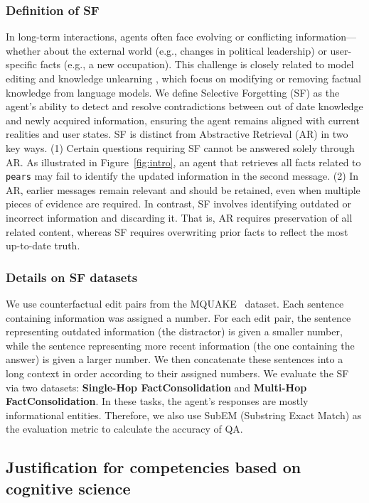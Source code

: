 \subsubsection{Definition of SF} In long-term interactions, agents often face evolving or conflicting information—whether about the external world (e.g., changes in political leadership) or user-specific facts (e.g., a new occupation). This challenge is closely related to model editing \citep{memit, alphaedit} and knowledge unlearning \citep{Large_Scale_Knowledge_Washing}, which focus on modifying or removing factual knowledge from language models.
We define Selective Forgetting (SF) as the agent’s ability to detect and resolve contradictions between out of date knowledge and newly acquired information, ensuring the agent remains aligned with current realities and user states.
SF is distinct from Abstractive Retrieval (AR) in two key ways. (1) Certain questions requiring SF cannot be answered solely through AR. As illustrated in Figure~\ref{fig:intro}, an agent that retrieves all facts related to \texttt{pears} may fail to identify the updated information in the second message. (2) In AR, earlier messages remain relevant and should be retained, even when multiple pieces of evidence are required. In contrast, SF involves identifying outdated or incorrect information and discarding it. That is, AR requires preservation of all related content, whereas SF requires overwriting prior facts to reflect the most up-to-date truth.

\subsubsection{Details on SF datasets}

We use counterfactual edit pairs from the MQUAKE~\citep{mquake} dataset. Each sentence containing information was assigned a number. For each edit pair, the sentence representing outdated information (the distractor) is given a smaller number, while the sentence representing more recent information (the one containing the answer) is given a larger number. We then concatenate these sentences into a long context in order according to their assigned numbers. We evaluate the SF via two datasets: \textbf{Single-Hop FactConsolidation} and \textbf{Multi-Hop FactConsolidation}. In these tasks, the agent's responses are mostly informational entities. Therefore, we also use SubEM (Substring Exact Match) as the evaluation metric to calculate the accuracy of QA.

\subsection{Justification for competencies based on cognitive science}

